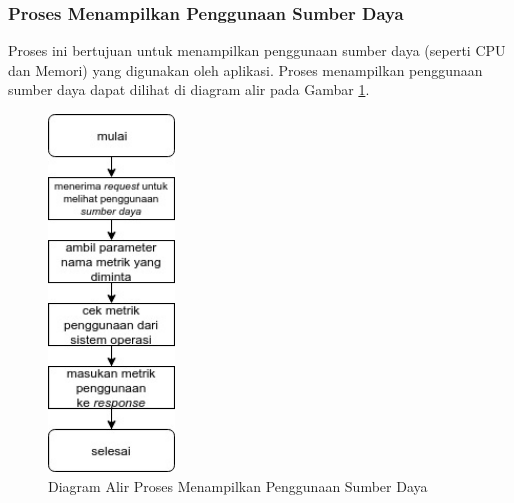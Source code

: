 \subsubsection{Proses Menampilkan Penggunaan Sumber Daya}
\par Proses ini bertujuan untuk menampilkan penggunaan sumber daya (seperti CPU dan Memori) yang digunakan oleh aplikasi. Proses menampilkan penggunaan sumber daya dapat dilihat di diagram alir pada Gambar \ref{fc:sumber_daya}.
\begin{figure}[hb]
	\centering\includegraphics[width=0.3\textwidth]{bab3/flowchart/flowchart-menampilkan_penggunaan_sumber_daya.jpg}
	\caption{Diagram Alir Proses Menampilkan Penggunaan Sumber Daya} \label{fc:sumber_daya}
\end{figure}

